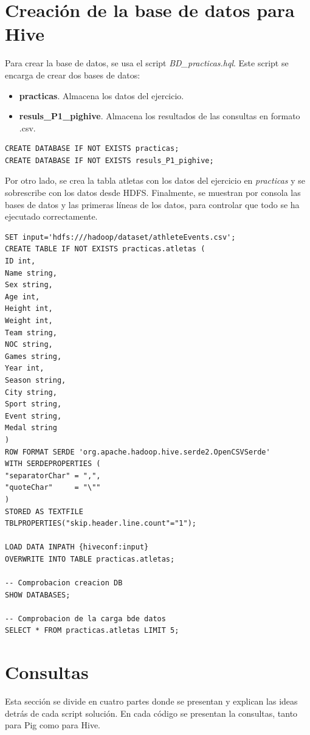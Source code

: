 \section*{Creación de la base de datos para Hive}
Para crear la base de datos, se usa el script \textit{BD\_practicas.hql}. Este script se encarga de crear dos bases de datos: 
\begin{itemize}
	\item \textbf{practicas}. Almacena los datos del ejercicio.
	\item \textbf{resuls\_P1\_pighive}. Almacena los resultados de las consultas en formato .csv.
\end{itemize}
\begin{lstlisting}[style=base,caption={Creación de bases de datos}, label={BD}]	
CREATE DATABASE IF NOT EXISTS practicas;
CREATE DATABASE IF NOT EXISTS resuls_P1_pighive;
\end{lstlisting}
Por otro lado, se crea la tabla atletas con los datos del ejercicio en \textit{practicas} y se sobrescribe con los datos desde HDFS. Finalmente, se muestran por consola las bases de datos y las primeras líneas de los datos, para controlar que todo se ha ejecutado correctamente.
\begin{lstlisting}[style=base,caption={Creación de bases de datos}, label={BD_tablas}]
SET input='hdfs:///hadoop/dataset/athleteEvents.csv';	
CREATE TABLE IF NOT EXISTS practicas.atletas (
ID int, 
Name string,
Sex string,
Age int,
Height int,
Weight int, 
Team string, 
NOC string,
Games string, 
Year int,
Season string,
City string,
Sport string,
Event string, 
Medal string 
)
ROW FORMAT SERDE 'org.apache.hadoop.hive.serde2.OpenCSVSerde'
WITH SERDEPROPERTIES (
"separatorChar" = ",",
"quoteChar"     = "\""
)
STORED AS TEXTFILE
TBLPROPERTIES("skip.header.line.count"="1");

LOAD DATA INPATH {hiveconf:input}
OVERWRITE INTO TABLE practicas.atletas;

-- Comprobacion creacion DB
SHOW DATABASES;

-- Comprobacion de la carga bde datos
SELECT * FROM practicas.atletas LIMIT 5; 
\end{lstlisting}

\section*{Consultas}
Esta sección se divide en cuatro partes donde se presentan y explican las ideas detrás de cada script solución. En cada código se presentan la consultas, tanto para Pig como para Hive.
